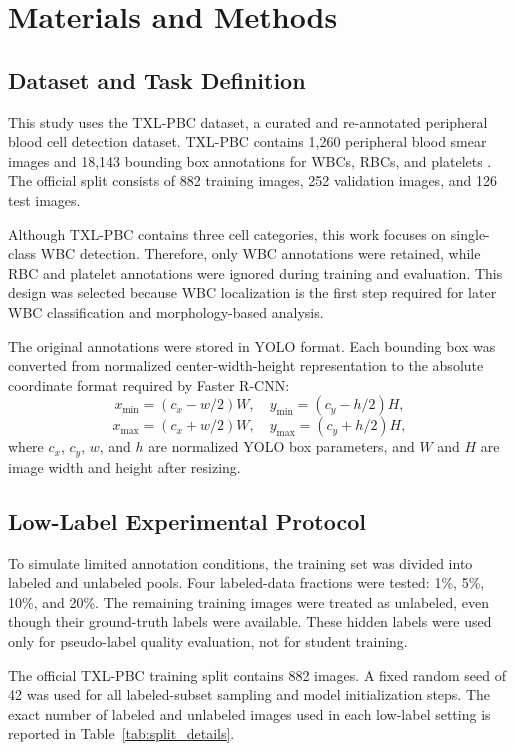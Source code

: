 \documentclass[conference,a4paper]{IEEEtran}
\begin{document}
\section{Materials and Methods}

\subsection{Dataset and Task Definition}
This study uses the TXL-PBC dataset, a curated and re-annotated peripheral blood cell detection dataset. TXL-PBC contains 1,260 peripheral blood smear images and 18,143 bounding box annotations for WBCs, RBCs, and platelets \cite{gan2025txlpbc}. The official split consists of 882 training images, 252 validation images, and 126 test images.

Although TXL-PBC contains three cell categories, this work focuses on single-class WBC detection. Therefore, only WBC annotations were retained, while RBC and platelet annotations were ignored during training and evaluation. This design was selected because WBC localization is the first step required for later WBC classification and morphology-based analysis.

The original annotations were stored in YOLO format. Each bounding box was converted from normalized center-width-height representation to the absolute coordinate format required by Faster R-CNN:
\begin{equation}
x_{\min} = (c_x - w/2)W, \quad y_{\min} = (c_y - h/2)H,
\end{equation}
\begin{equation}
x_{\max} = (c_x + w/2)W, \quad y_{\max} = (c_y + h/2)H,
\end{equation}
where $c_x$, $c_y$, $w$, and $h$ are normalized YOLO box parameters, and $W$ and $H$ are image width and height after resizing.

\subsection{Low-Label Experimental Protocol}
To simulate limited annotation conditions, the training set was divided into labeled and unlabeled pools. Four labeled-data fractions were tested: 1\%, 5\%, 10\%, and 20\%. The remaining training images were treated as unlabeled, even though their ground-truth labels were available. These hidden labels were used only for pseudo-label quality evaluation, not for student training.

The official TXL-PBC training split contains 882 images. A fixed random seed of 42 was used for all labeled-subset sampling and model initialization steps. The exact number of labeled and unlabeled images used in each low-label setting is reported in Table~\ref{tab:split_details}.
\end{document}
